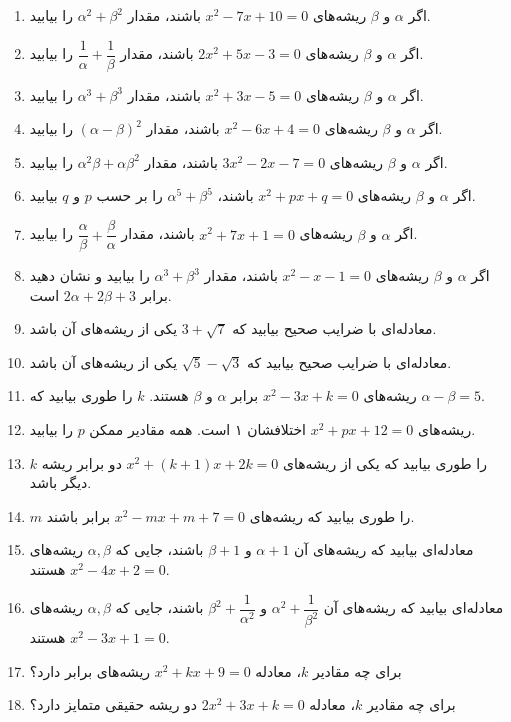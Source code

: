\documentclass[12pt,a4paper]{article}
\begin{document}
\setcounter{enumi}{90}
\begin{enumerate}
\item اگر $\alpha$ و $\beta$ ریشه‌های $x^2 - 7x + 10 = 0$ باشند، مقدار $\alpha^2 + \beta^2$ را بیابید.
\item اگر $\alpha$ و $\beta$ ریشه‌های $2x^2 + 5x - 3 = 0$ باشند، مقدار $\dfrac{1}{\alpha} + \dfrac{1}{\beta}$ را بیابید.
\item اگر $\alpha$ و $\beta$ ریشه‌های $x^2 + 3x - 5 = 0$ باشند، مقدار $\alpha^3 + \beta^3$ را بیابید.
\item اگر $\alpha$ و $\beta$ ریشه‌های $x^2 - 6x + 4 = 0$ باشند، مقدار $(\alpha - \beta)^2$ را بیابید.
\item اگر $\alpha$ و $\beta$ ریشه‌های $3x^2 - 2x - 7 = 0$ باشند، مقدار $\alpha^2 \beta + \alpha \beta^2$ را بیابید.
\item اگر $\alpha$ و $\beta$ ریشه‌های $x^2 + px + q = 0$ باشند، $\alpha^5 + \beta^5$ را بر حسب $p$ و $q$ بیابید.
\item اگر $\alpha$ و $\beta$ ریشه‌های $x^2 + 7x + 1 = 0$ باشند، مقدار $\dfrac{\alpha}{\beta} + \dfrac{\beta}{\alpha}$ را بیابید.
\item اگر $\alpha$ و $\beta$ ریشه‌های $x^2 - x - 1 = 0$ باشند، مقدار $\alpha^3 + \beta^3$ را بیابید و نشان دهید برابر $2\alpha + 2\beta + 3$ است.
\item معادله‌ای با ضرایب صحیح بیابید که $3 + \sqrt{7}$ یکی از ریشه‌های آن باشد.
\item معادله‌ای با ضرایب صحیح بیابید که $\sqrt{5} - \sqrt{3}$ یکی از ریشه‌های آن باشد.
\item ریشه‌های $x^2 - 3x + k = 0$ برابر $\alpha$ و $\beta$ هستند. $k$ را طوری بیابید که $\alpha - \beta = 5$.
\item ریشه‌های $x^2 + px + 12 = 0$ اختلافشان ۱ است. همه مقادیر ممکن $p$ را بیابید.
\item $k$ را طوری بیابید که یکی از ریشه‌های $x^2 + (k+1)x + 2k = 0$ دو برابر ریشه دیگر باشد.
\item $m$ را طوری بیابید که ریشه‌های $x^2 - mx + m + 7 = 0$ برابر باشند.
\item معادله‌ای بیابید که ریشه‌های آن $\alpha + 1$ و $\beta + 1$ باشند، جایی که $\alpha, \beta$ ریشه‌های $x^2 - 4x + 2 = 0$ هستند.
\item معادله‌ای بیابید که ریشه‌های آن $\alpha^2 + \dfrac{1}{\beta^2}$ و $\beta^2 + \dfrac{1}{\alpha^2}$ باشند، جایی که $\alpha, \beta$ ریشه‌های $x^2 - 3x + 1 = 0$ هستند.
\item برای چه مقادیر $k$، معادله $x^2 + kx + 9 = 0$ ریشه‌های برابر دارد؟
\item برای چه مقادیر $k$، معادله $2x^2 + 3x + k = 0$ دو ریشه حقیقی متمایز دارد؟

\end{enumerate}
\end{document}
